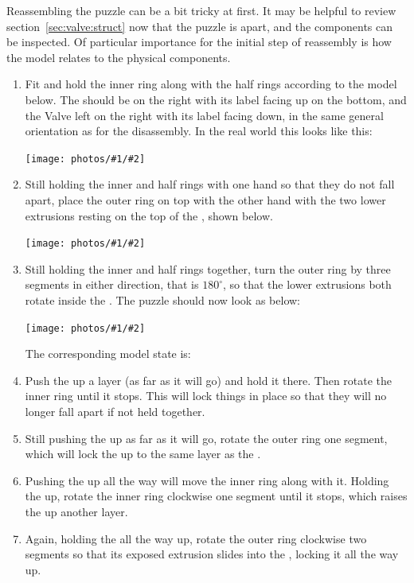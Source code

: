 \documentclass{article}
\newcommand{\photo}[3]{
      \begin{center}
            \texttt{[image: photos/\#1/\#2]}
      \end{center}
}
\begin{document}
Reassembling the puzzle can be a bit tricky at first.
It may be helpful to review section~\ref{sec:valve:struct} now that the puzzle is apart, and the components can be inspected.
Of particular importance for the initial step of reassembly is how the model relates to the physical components.
\begin{enumerate}
      \item Fit and hold the inner ring along with the half rings according to the model below.
            The \hhalf{} should be on the right with its label facing up on the bottom, and the Valve left on the right with its label facing down, in the same general orientation as for the disassembly.
            In the real world this looks like this:
            \photo{valve}{together-1}{1.5}
      \item Still holding the inner and half rings with one hand so that they do not fall apart, place the outer ring on top with the other hand with the two lower extrusions resting on the top of the \vhalf{}, shown below.
            \photo{valve}{together-2}{1.5}
      \item Still holding the inner and half rings together, turn the outer ring by three segments in either direction, that is $180^\circ$, so that the lower extrusions both rotate inside the \hhalf{}.
            The puzzle should now look as below:
            \photo{valve}{together-3}{1.5}
            The corresponding model state is:
      \item Push the \vhalf{} up a layer (as far as it will go) and hold it there.
            Then rotate the inner ring \cc{} until it stops.
            This will lock things in place so that they will no longer fall apart if not held together.
      \item Still pushing the \vhalf{} up as far as it will go, rotate the outer ring \cc{} one segment, which will lock the \vhalf{} up to the same layer as the \hhalf{}.
      \item Pushing the \hhalf{} up all the way will move the inner ring along with it.
            Holding the \hhalf{} up, rotate the inner ring clockwise one segment until it stops, which raises the \hhalf{} up another layer.
      \item Again, holding the \hhalf{} all the way up, rotate the outer ring clockwise two segments so that its exposed extrusion slides into the \hhalf{}, locking it all the way up.

\end{enumerate}
\end{document}
